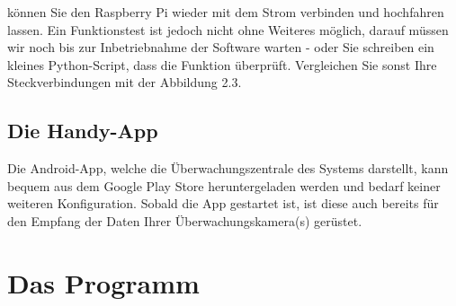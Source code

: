 \documentclass[12pt,a4paper]{scrreprt}
\begin{document}
können Sie den Raspberry Pi wieder mit dem Strom verbinden und hochfahren lassen. Ein Funktionstest ist jedoch nicht ohne Weiteres möglich, darauf müssen wir noch bis zur Inbetriebnahme der Software warten - oder Sie schreiben ein kleines Python-Script, dass die Funktion überprüft. Vergleichen Sie sonst Ihre Steckverbindungen mit der Abbildung 2.3.

\section{Die Handy-App}
Die Android-App, welche die Überwachungszentrale des Systems darstellt, kann bequem aus dem Google Play Store heruntergeladen werden und bedarf keiner weiteren Konfiguration. Sobald die App gestartet ist, ist diese auch bereits für den Empfang der Daten Ihrer Überwachungskamera(s) gerüstet.

\chapter{Das Programm}
\end{document}
